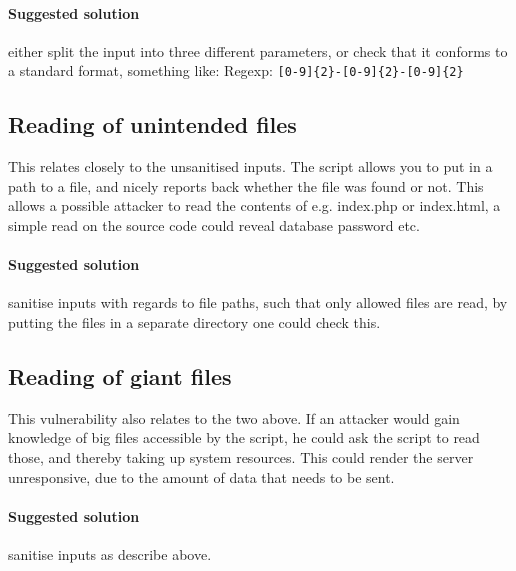 \paragraph{Suggested solution} either split the input into three different
parameters, or check that it conforms to a standard format, something like:
Regexp: \texttt{[0-9]\{2\}-[0-9]\{2\}-[0-9]\{2\}}

\subsection{Reading of unintended files}
This relates closely to the unsanitised inputs. The script allows you to put in
a path to a file, and nicely reports back whether the file was found or not.
This allows a possible attacker to read the contents of e.g. index.php or
index.html, a simple read on the source code could reveal database password
etc.

\paragraph{Suggested solution} sanitise inputs with regards to file paths, such
that only allowed files are read, by putting the files in a separate directory
one could check this.

\subsection{Reading of giant files}
This vulnerability also relates to the two above. If an attacker would gain
knowledge of big files accessible by the script, he could ask the script to
read those, and thereby taking up system resources. This could render the
server unresponsive, due to the amount of data that needs to be sent.

\paragraph{Suggested solution} sanitise inputs as describe above.
